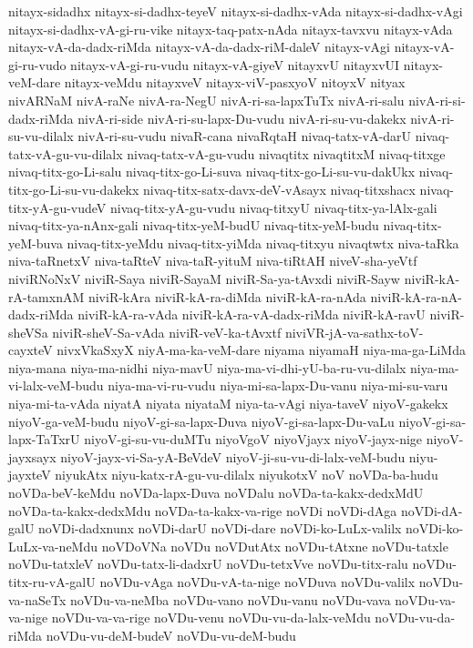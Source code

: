{nitayx-sidadhx
nitayx-si-dadhx-teyeV
nitayx-si-dadhx-vAda
nitayx-si-dadhx-vAgi
nitayx-si-dadhx-vA-gi-ru-vike
nitayx-taq-patx-nAda
nitayx-tavxvu
nitayx-vAda
nitayx-vA-da-dadx-riMda
nitayx-vA-da-dadx-riM-daleV
nitayx-vAgi
nitayx-vA-gi-ru-vudo
nitayx-vA-gi-ru-vudu
nitayx-vA-giyeV
nitayxvU
nitayxvUI
nitayx-veM-dare
nitayx-veMdu
nitayxveV
nitayx-viV-pasxyoV
nitoyxV
nityax
nivARNaM
nivA-raNe
nivA-ra-NegU
nivA-ri-sa-lapxTuTx
nivA-ri-salu
nivA-ri-si-dadx-riMda
nivA-ri-side
nivA-ri-su-lapx-Du-vudu
nivA-ri-su-vu-dakekx
nivA-ri-su-vu-dilalx
nivA-ri-su-vudu
nivaR-cana
nivaRqtaH
nivaq-tatx-vA-darU
nivaq-tatx-vA-gu-vu-dilalx
nivaq-tatx-vA-gu-vudu
nivaqtitx
nivaqtitxM
nivaq-titxge
nivaq-titx-go-Li-salu
nivaq-titx-go-Li-suva
nivaq-titx-go-Li-su-vu-dakUkx
nivaq-titx-go-Li-su-vu-dakekx
nivaq-titx-satx-davx-deV-vAsayx
nivaq-titxshacx
nivaq-titx-yA-gu-vudeV
nivaq-titx-yA-gu-vudu
nivaq-titxyU
nivaq-titx-ya-lAlx-gali
nivaq-titx-ya-nAnx-gali
nivaq-titx-yeM-budU
nivaq-titx-yeM-budu
nivaq-titx-yeM-buva
nivaq-titx-yeMdu
nivaq-titx-yiMda
nivaq-titxyu
nivaqtwtx
niva-taRka
niva-taRnetxV
niva-taRteV
niva-taR-yituM
niva-tiRtAH
niveV-sha-yeVtf
niviRNoNxV
niviR-Saya
niviR-SayaM
niviR-Sa-ya-tAvxdi
niviR-Sayw
niviR-kA-rA-tamxnAM
niviR-kAra
niviR-kA-ra-diMda
niviR-kA-ra-nAda
niviR-kA-ra-nA-dadx-riMda
niviR-kA-ra-vAda
niviR-kA-ra-vA-dadx-riMda
niviR-kA-ravU
niviR-sheVSa
niviR-sheV-Sa-vAda
niviR-veV-ka-tAvxtf
niviVR-jA-va-sathx-toV-cayxteV
nivxVkaSxyX
niyA-ma-ka-veM-dare
niyama
niyamaH
niya-ma-ga-LiMda
niya-mana
niya-ma-nidhi
niya-mavU
niya-ma-vi-dhi-yU-ba-ru-vu-dilalx
niya-ma-vi-lalx-veM-budu
niya-ma-vi-ru-vudu
niya-mi-sa-lapx-Du-vanu
niya-mi-su-varu
niya-mi-ta-vAda
niyatA
niyata
niyataM
niya-ta-vAgi
niya-taveV
niyoV-gakekx
niyoV-ga-veM-budu
niyoV-gi-sa-lapx-Duva
niyoV-gi-sa-lapx-Du-vaLu
niyoV-gi-sa-lapx-TaTxrU
niyoV-gi-su-vu-duMTu
niyoVgoV
niyoVjayx
niyoV-jayx-nige
niyoV-jayxsayx
niyoV-jayx-vi-Sa-yA-BeVdeV
niyoV-ji-su-vu-di-lalx-veM-budu
niyu-jayxteV
niyukAtx
niyu-katx-rA-gu-vu-dilalx
niyukotxV
noV
noVDa-ba-hudu
noVDa-beV-keMdu
noVDa-lapx-Duva
noVDalu
noVDa-ta-kakx-dedxMdU
noVDa-ta-kakx-dedxMdu
noVDa-ta-kakx-va-rige
noVDi
noVDi-dAga
noVDi-dA-galU
noVDi-dadxnunx
noVDi-darU
noVDi-dare
noVDi-ko-LuLx-valilx
noVDi-ko-LuLx-va-neMdu
noVDoVNa
noVDu
noVDutAtx
noVDu-tAtxne
noVDu-tatxle
noVDu-tatxleV
noVDu-tatx-li-dadxrU
noVDu-tetxVve
noVDu-titx-ralu
noVDu-titx-ru-vA-galU
noVDu-vAga
noVDu-vA-ta-nige
noVDuva
noVDu-valilx
noVDu-va-naSeTx
noVDu-va-neMba
noVDu-vano
noVDu-vanu
noVDu-vava
noVDu-va-va-nige
noVDu-va-va-rige
noVDu-venu
noVDu-vu-da-lalx-veMdu
noVDu-vu-da-riMda
noVDu-vu-deM-budeV
noVDu-vu-deM-budu
}
